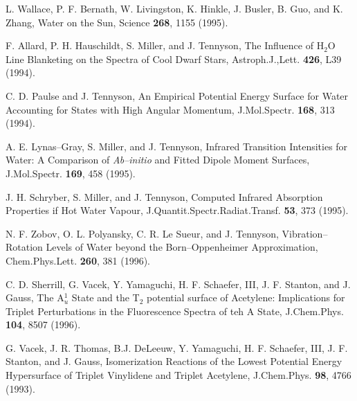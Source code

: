 \begin{thebibliography}{999}
L. Wallace, P. F. Bernath, W. Livingston, K. Hinkle, J. Busler,
B. Guo, and K. Zhang, 
Water on the Sun,
Science {\bf 268}, 1155 (1995).

F. Allard, P. H. Hauschildt, S. Miller, and J. Tennyson,
The Influence of H$_2$O Line Blanketing on the Spectra of
Cool Dwarf Stars,
Astroph.J.,Lett. {\bf 426}, L39 (1994).

C. D. Paulse and J. Tennyson, 
An Empirical Potential Energy Surface for Water Accounting for
States with High Angular Momentum,
J.Mol.Spectr. {\bf 168}, 313 (1994).

A. E. Lynas--Gray, S. Miller, and J. Tennyson,
Infrared Transition Intensities for Water: A Comparison of
{\it Ab--initio} and Fitted Dipole Moment Surfaces,
J.Mol.Spectr. {\bf 169}, 458 (1995).

J. H. Schryber, S. Miller, and J. Tennyson,
Computed Infrared Absorption Properties if Hot Water Vapour,
J.Quantit.Spectr.Radiat.Transf. {\bf 53}, 373 (1995).


N. F. Zobov, O. L. Polyansky, C. R. Le Sueur, and J. Tennyson,
Vibration--Rotation Levels of Water beyond the 
Born--Oppenheimer Approximation,
Chem.Phys.Lett. {\bf 260}, 381 (1996).



%
%
%
%

C. D. Sherrill, G. Vacek, Y. Yamaguchi, H. F. Schaefer, III, 
J. F. Stanton, and J. Gauss,
The A$^1_u$ State and the T$_2$ potential surface
of Acetylene: Implications for Triplet Perturbations in the
Fluorescence Spectra of teh A State,
J.Chem.Phys. {\bf 104}, 8507 (1996).

G. Vacek, J. R. Thomas, B.J. DeLeeuw, Y. Yamaguchi, H. F. Schaefer, III, 
J. F. Stanton, and J. Gauss,
Isomerization Reactions of the Lowest Potential
Energy Hypersurface of Triplet Vinylidene and Triplet Acetylene,
J.Chem.Phys. {\bf 98}, 4766 (1993).


\end{thebibliography}
